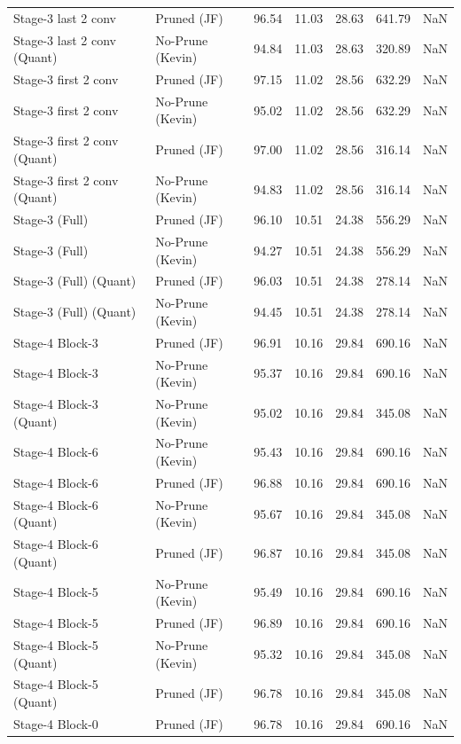 \begin{table}
\begin{tabular}{llrrrrl}
Stage-3 last 2 conv & Pruned (JF) & 96.54 & 11.03 & 28.63 & 641.79 & NaN \\
Stage-3 last 2 conv
(Quant) & No-Prune (Kevin) & 94.84 & 11.03 & 28.63 & 320.89 & NaN \\
Stage-3 first 2 conv & Pruned (JF) & 97.15 & 11.02 & 28.56 & 632.29 & NaN \\
Stage-3 first 2 conv & No-Prune (Kevin) & 95.02 & 11.02 & 28.56 & 632.29 & NaN \\
Stage-3 first 2 conv
(Quant) & Pruned (JF) & 97.00 & 11.02 & 28.56 & 316.14 & NaN \\
Stage-3 first 2 conv
(Quant) & No-Prune (Kevin) & 94.83 & 11.02 & 28.56 & 316.14 & NaN \\
Stage-3 (Full) & Pruned (JF) & 96.10 & 10.51 & 24.38 & 556.29 & NaN \\
Stage-3 (Full) & No-Prune (Kevin) & 94.27 & 10.51 & 24.38 & 556.29 & NaN \\
Stage-3 (Full)
(Quant) & Pruned (JF) & 96.03 & 10.51 & 24.38 & 278.14 & NaN \\
Stage-3 (Full)
(Quant) & No-Prune (Kevin) & 94.45 & 10.51 & 24.38 & 278.14 & NaN \\
Stage-4 Block-3 & Pruned (JF) & 96.91 & 10.16 & 29.84 & 690.16 & NaN \\
Stage-4 Block-3 & No-Prune (Kevin) & 95.37 & 10.16 & 29.84 & 690.16 & NaN \\
Stage-4 Block-3
(Quant) & No-Prune (Kevin) & 95.02 & 10.16 & 29.84 & 345.08 & NaN \\
Stage-4 Block-6 & No-Prune (Kevin) & 95.43 & 10.16 & 29.84 & 690.16 & NaN \\
Stage-4 Block-6 & Pruned (JF) & 96.88 & 10.16 & 29.84 & 690.16 & NaN \\
Stage-4 Block-6
(Quant) & No-Prune (Kevin) & 95.67 & 10.16 & 29.84 & 345.08 & NaN \\
Stage-4 Block-6
(Quant) & Pruned (JF) & 96.87 & 10.16 & 29.84 & 345.08 & NaN \\
Stage-4 Block-5 & No-Prune (Kevin) & 95.49 & 10.16 & 29.84 & 690.16 & NaN \\
Stage-4 Block-5 & Pruned (JF) & 96.89 & 10.16 & 29.84 & 690.16 & NaN \\
Stage-4 Block-5
(Quant) & No-Prune (Kevin) & 95.32 & 10.16 & 29.84 & 345.08 & NaN \\
Stage-4 Block-5
(Quant) & Pruned (JF) & 96.78 & 10.16 & 29.84 & 345.08 & NaN \\
Stage-4 Block-0 & Pruned (JF) & 96.78 & 10.16 & 29.84 & 690.16 & NaN \\

\end{tabular}
\end{table}
